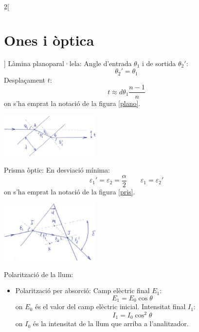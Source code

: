 \documentclass[../../../main.tex]{subfiles}
\begin{document}
\begin{multicols}{2}[\section{Ones i òptica}]
Làmina planoparal·lela:\newline
Angle d'entrada $\theta_1$ i de sortida $\theta_2'$: $$\theta_2'=\theta_1$$
Desplaçament $t$: $$t\approx d\theta_1\frac{n-1}{n}$$
{\footnotesize on s'ha emprat la notació de la figura \ref{plano}.}\newline
\begin{minipage}{\linewidth}
    \includegraphics[width=5cm]{Physics/1st/Waves_and_optics/Images/plano.jpg} 
    \label{plano}
\end{minipage}
Prisma òptic: \newline
En desviació mínima: $$\varepsilon_1'=\varepsilon_2=\frac{\alpha}{2}\qquad\varepsilon_1=\varepsilon_2'$$ {\footnotesize on s'ha emprat la notació de la figura \ref{pris}.}\newline
\begin{minipage}{\linewidth}
    \includegraphics[width=5cm]{Physics/1st/Waves_and_optics/Images/prisma.jpg} 
    \label{pris}
\end{minipage}
Polarització de la llum:
\begin{itemize}
    \item Polarització per absorció:\newline
    Camp elèctric final $E_1$:
    \begin{equation*}
        E_1=E_0\cos\theta
    \end{equation*}
    {\footnotesize on $E_0$ és el valor del camp elèctric inicial.}
    Intensitat final $I_1$:
    \begin{equation*}
        I_1=I_0\cos^2\theta
    \end{equation*}
    {\footnotesize on $I_0$ és la intensitat de la llum que arriba a l'analitzador.}\newline

\end{itemize}
\end{multicols}
\end{document}
